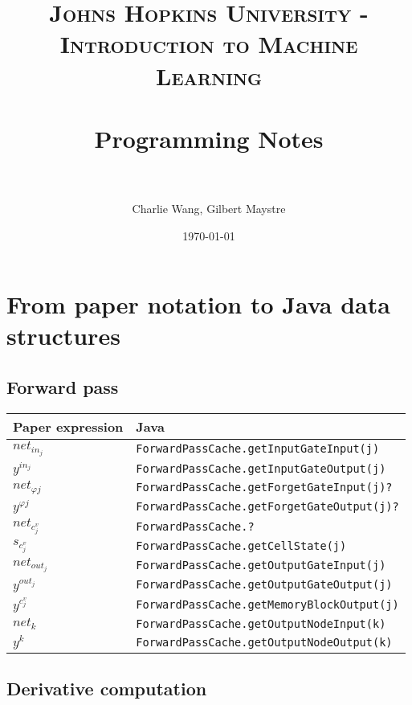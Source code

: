 \documentclass[paper=A4, fontsize=11pt]{scrartcl} %
\title{	
\normalfont \normalsize 
\textsc{Johns Hopkins University - Introduction to Machine Learning} \\ [25pt] %
\horrule{0.5pt} \\[0.4cm] %
\huge Programming Notes \\ %
\horrule{2pt} \\[0.5cm] %
}
\author{Charlie Wang, Gilbert Maystre} %
\date{\normalsize\today} %
\begin{document}
\maketitle %
\newpage

\section{From paper notation to Java data structures}

\subsection{Forward pass}

\begin{center}
\begin{tabular}{|l|l|} 
	\hline
 		Paper expression & Java\\ 
 	\hline
 	\hline
 		$net_{in_j}$ & \verb!ForwardPassCache.getInputGateInput(j)! \\ 
 	\hline
  		$y^{in_j}$ & \verb!ForwardPassCache.getInputGateOutput(j)! \\ 
 	\hline
   		$net_{\varphi j}$ & \verb!ForwardPassCache.getForgetGateInput(j)?! \\ 
 	\hline
   		$y^{\varphi j}$ & \verb!ForwardPassCache.getForgetGateOutput(j)?! \\ 
 	\hline
   		$net_{c_j^v}$ & \verb!ForwardPassCache.?! \\ 
 	\hline
   		$s_{c_j^v}$ & \verb!ForwardPassCache.getCellState(j)! \\ 
 	\hline
   		$net_{out_j}$ & \verb!ForwardPassCache.getOutputGateInput(j)! \\ 
 	\hline
   		$y^{out_j}$ & \verb!ForwardPassCache.getOutputGateOutput(j)! \\ 
 	\hline
   		$y^{c_j^v}$ & \verb!ForwardPassCache.getMemoryBlockOutput(j)! \\ 
 	\hline
   		$net_k$ & \verb!ForwardPassCache.getOutputNodeInput(k)! \\ 
 	\hline
   		$y^k$ & \verb!ForwardPassCache.getOutputNodeOutput(k)! \\ 
 	\hline
\end{tabular}
\end{center}

\subsection{Derivative computation}
\end{document}
